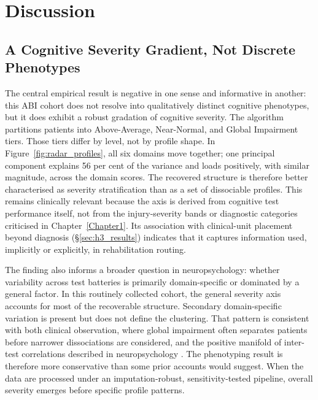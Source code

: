 
\chapter{Discussion}\label{Chapter5}


\section{A Cognitive Severity Gradient, Not Discrete Phenotypes}

The central empirical result is negative in one sense and informative in another: this ABI cohort does not resolve into qualitatively distinct cognitive phenotypes, but it does exhibit a robust gradation of cognitive severity. The algorithm partitions patients into Above-Average, Near-Normal, and Global Impairment tiers. Those tiers differ by level, not by profile shape. In Figure~\ref{fig:radar_profiles}, all six domains move together; one principal component explains 56 per cent of the variance and loads positively, with similar magnitude, across the domain scores. The recovered structure is therefore better characterised as severity stratification than as a set of dissociable profiles. This remains clinically relevant because the axis is derived from cognitive test performance itself, not from the injury-severity bands or diagnostic categories criticised in Chapter~\ref{Chapter1}. Its association with clinical-unit placement beyond diagnosis (§\ref{sec:h3_results}) indicates that it captures information used, implicitly or explicitly, in rehabilitation routing.

The finding also informs a broader question in neuropsychology: whether variability across test batteries is primarily domain-specific or dominated by a general factor. In this routinely collected cohort, the general severity axis accounts for most of the recoverable structure. Secondary domain-specific variation is present but does not define the clustering. That pattern is consistent with both clinical observation, where global impairment often separates patients before narrower dissociations are considered, and the positive manifold of inter-test correlations described in neuropsychology \parencite{lezak2012neuropsychological}. The phenotyping result is therefore more conservative than some prior accounts would suggest. When the data are processed under an imputation-robust, sensitivity-tested pipeline, overall severity emerges before specific profile patterns.


